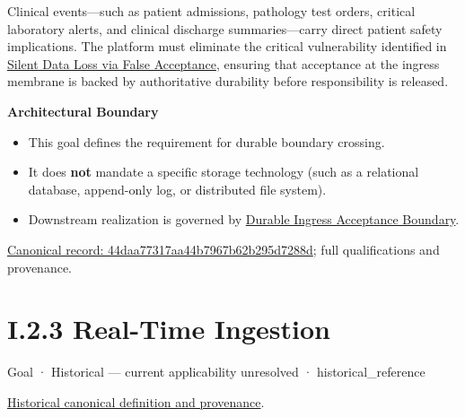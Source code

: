 Clinical events—such as patient admissions, pathology test orders, critical laboratory alerts, and clinical discharge summaries—carry direct patient safety implications. The platform must eliminate the critical vulnerability identified in \href{\detokenize{../../../../../../../../../docs/markdown/01-motivation/drivers-assessments/assessments.md}}{Silent Data Loss via False Acceptance}, ensuring that acceptance at the ingress membrane is backed by authoritative durability before responsibility is released.



\par\medskip\textbf{Architectural Boundary}\par


\begin{itemize}


\item This goal defines the requirement for durable boundary crossing.

\item It does \textbf{not} mandate a specific storage technology (such as a relational database, append-only log, or distributed file system).

\item Downstream realization is governed by \href{\detokenize{../../../../../../../../../docs/markdown/01-motivation/requirements-constraints/foundational-requirements.md}}{\texttt{} Durable Ingress Acceptance Boundary}.

\end{itemize}

{\footnotesize \href{../../../../../../../../continuum/motivation/goal/44daa77317aa44b7967b62b295d7288d.md}{Canonical record: 44daa77317aa44b7967b62b295d7288d}; full qualifications and provenance.}\par
\section*{I.2.3 Real-Time Ingestion}
\label{navigation:I.2.3}

\label{element:d43c345839e548589e2b6aa677022f8b}
{\small Goal · Historical — current applicability unresolved · historical\_reference}\par
\href{../../../../../../../../continuum/motivation/goal/d43c345839e548589e2b6aa677022f8b.md}{Historical canonical definition and provenance}.\par
